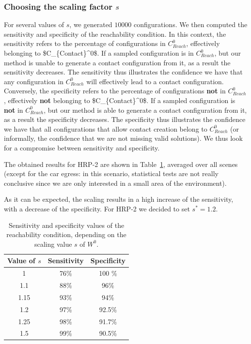 \subsubsection{Choosing the scaling factor $s$} \label{sec:params}
For several values of $s$, we generated $10 000$ configurations. 
We then computed the sensitivity and specificity of the reachability condition.  In this context, the sensitivity refers to the percentage of configurations in $C_{Reach}^0$, effectively belonging to \gls{$C_{Contact}^0$}. If a sampled configuration is in $C_{Reach}^0$, but our method is unable to generate a contact configuration from it, as a result the sensitivity
decreases. The sensitivity thus illustrates the confidence we have that any configuration in $C_{Reach}^0$ will effectively lead to a contact configuration.
Conversely, the specificity refers to the percentage of configurations \textbf{not} in $C_{Reach}^0$, effectively \textbf{not} belonging to \gls{$C_{Contact}^0$}.
If a sampled configuration is \textbf{not} in $C_{Reach}^0$, but our method is able to generate a contact configuration from it, as a result the specificity
decreases. The specificity thus illustrates the confidence we have that all configurations that allow contact creation belong to $C_{Reach}^0$ (or informally, the confidence that we are not missing valid solutions).
We thus look for a compromise between sensitivity and specificity.

The obtained results for HRP-2 are shown in Table~\ref{tab:scale}, averaged over all scenes (except for the car egress: in this scenario, 
statistical tests are not really conclusive since we are only interested in a small area of the environment).

As it can be expected, the scaling results in a high increase of the sensitivity, with a decrease of the specificity.
For HRP-2 we decided to set $s^*=1.2$.

\begin{table}
\centering
\footnotesize
\begin{tabular}{c | c | c}
   Value of $s$ &  Sensitivity & Specificity\\
 \hline
   1   & 76\% & 100 \%\\
   1.1& 88\% & 96\% \\
   1.15& 93\% & 94\%\\
   1.2 & 97\% & 92.5\%\\
   1.25& 98\% & 91.7\%\\
   1.5 & 99\% & 90.5\%\\
 \end{tabular}
\caption{Sensitivity and specificity values of the reachability condition, depending on the scaling value $s$ of $W^0$.}
\label{tab:scale}
\quad
\end{table}

